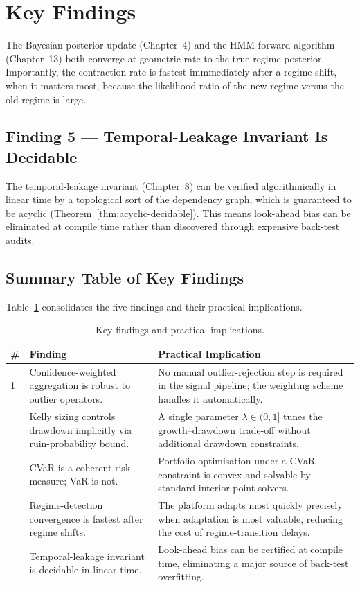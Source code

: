 \documentclass[12pt,openany]{book}
\numberwithin{equation}{chapter}
\theoremstyle{plain}
\theoremstyle{definition}
\theoremstyle{remark}
\newenvironment{keyfindings}{%
  \chapter*{Key Findings}
}{%
}
\numberwithin{equation}{chapter}
\theoremstyle{plain}
\begin{document}
\begin{keyfindings}
The Bayesian posterior update (Chapter~4) and the HMM forward
algorithm (Chapter~13) both converge at geometric rate to the true
regime posterior.  Importantly, the contraction rate is fastest
immmediately after a regime shift, when it matters most, because
the likelihood ratio of the new regime versus the old regime is
large.

\section*{Finding 5 — Temporal-Leakage Invariant Is Decidable}

The temporal-leakage invariant (Chapter~8) can be verified
algorithmically in linear time by a topological sort of the
dependency graph, which is guaranteed to be acyclic
(Theorem~\ref{thm:acyclic-decidable}).  This means look-ahead
bias can be eliminated at compile time rather than discovered
through expensive back-test audits.

\section*{Summary Table of Key Findings}

Table~\ref{tab:key-findings-summary} consolidates the five findings
and their practical implications.

\begin{table}[H]
  \centering
  \caption{Key findings and practical implications.}
  \label{tab:key-findings-summary}
  \begin{tabularx}{\linewidth}{@{} l X X @{}}
    \toprule
    \textbf{\#} & \textbf{Finding} & \textbf{Practical Implication} \\
    \midrule
    1 &
      Confidence-weighted aggregation is robust to outlier operators. &
      No manual outlier-rejection step is required in the signal
      pipeline; the weighting scheme handles it automatically. \\
    \addlinespace
    2 &
      Kelly sizing controls drawdown implicitly via ruin-probability
      bound. &
      A single parameter $\lambda\in(0,1]$ tunes the growth--drawdown
      trade-off without additional drawdown constraints. \\
    \addlinespace
    3 &
      CVaR is a coherent risk measure; VaR is not. &
      Portfolio optimisation under a CVaR constraint is convex and
      solvable by standard interior-point solvers. \\
    \addlinespace
    4 &
      Regime-detection convergence is fastest after regime shifts. &
      The platform adapts most quickly precisely when adaptation is
      most valuable, reducing the cost of regime-transition delays. \\
    \addlinespace
    5 &
      Temporal-leakage invariant is decidable in linear time. &
      Look-ahead bias can be certified at compile time, eliminating
      a major source of back-test overfitting. \\
    \bottomrule
  \end{tabularx}
\end{table}

\end{keyfindings}
\end{document}
